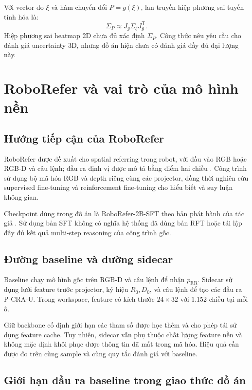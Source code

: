 Với vector đo $\xi$ và hàm chuyển đổi $P=g(\xi)$, lan truyền hiệp phương sai tuyến tính hóa là:
\begin{equation}
    \Sigma_P\approx J_g\Sigma_\xi J_g^{\mathsf T}.
    \label{eq:theory-uncertainty-propagation}
\end{equation}
Hiệp phương sai heatmap 2D chưa đủ xác định $\Sigma_P$. Công thức nêu yêu cầu cho đánh giá uncertainty 3D, nhưng đồ án hiện chưa có đánh giá đầy đủ đại lượng này.

\section{RoboRefer và vai trò của mô hình nền}
\label{sec:theory-roborefer}

\subsection{Hướng tiếp cận của RoboRefer}

RoboRefer được đề xuất cho spatial referring trong robot, với đầu vào RGB hoặc RGB-D và câu lệnh; đầu ra định vị được mô tả bằng điểm hai chiều \cite{zhou2025roborefer}. Công trình sử dụng bộ mã hóa RGB và depth riêng cùng các projector, đồng thời nghiên cứu supervised fine-tuning và reinforcement fine-tuning cho hiểu biết và suy luận không gian.

Checkpoint dùng trong đồ án là RoboRefer-2B-SFT theo bản phát hành của tác giả \cite{roborefer2bsftModelCard}. Sử dụng bản SFT không có nghĩa hệ thống đã dùng bản RFT hoặc tái lập đầy đủ kết quả multi-step reasoning của công trình gốc.

\subsection{Đường baseline và đường sidecar}

Baseline chạy mô hình gốc trên RGB-D và câu lệnh để nhận $p_{\mathrm{RR}}$. Sidecar sử dụng lưới feature trước projector, ký hiệu $R_0,D_0$, và câu lệnh để tạo các đầu ra P-CRA-U. Trong workspace, feature có kích thước $24\times32$ với 1.152 chiều tại mỗi ô.

Giữ backbone cố định giới hạn các tham số được học thêm và cho phép tái sử dụng feature cache. Tuy nhiên, sidecar vẫn phụ thuộc chất lượng feature nền và không mặc định khôi phục được thông tin đã mất trong mã hóa. Hiệu quả cần được đo trên cùng sample và cùng quy tắc đánh giá với baseline.

\subsection{Giới hạn đầu ra baseline trong giao thức đồ án}


